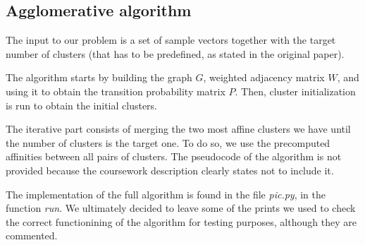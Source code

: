 \documentclass[
	10pt,
	parskip=half-,	
	paper=a4,
	english
	]{scrartcl}
\begin{document}
\subsection{Agglomerative algorithm}

The input to our problem is a set of sample vectors together with the target number of clusters (that has to be predefined, as stated in the original paper).

The algorithm starts by building the graph \(G\), weighted adjacency matrix \(W\), and using it to obtain the transition probability matrix \(P\). Then, cluster initialization is run to obtain the initial clusters.

The iterative part consists of merging the two most affine clusters we have until the number of clusters is the target one. To do so, we use the precomputed affinities between all pairs of clusters. The pseudocode of the algorithm is not provided because the coursework description clearly states not to include it.

The implementation of the full algorithm is found in the file \textit{pic.py}, in the function \textit{run}. We ultimately decided to leave some of the prints we used to check the correct functionining of the algorithm for testing purposes, although they are commented.


\end{document}
